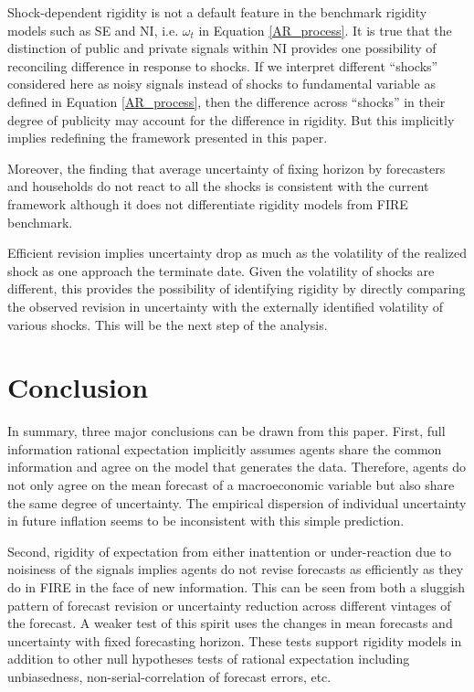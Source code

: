 \documentclass[12pt]{article}
\begin{document}
	Shock-dependent rigidity is not a default feature in the benchmark rigidity models such as SE and NI, i.e. $\omega_t$ in Equation \ref{AR_process}. It is true that the distinction of public and private signals within NI provides one possibility of reconciling difference in response to shocks.  If we interpret different ``shocks'' considered here as noisy signals instead of shocks to fundamental variable as defined in Equation \ref{AR_process}, then the difference across ``shocks'' in their degree of publicity may account for the difference in rigidity.  But this implicitly implies redefining the  framework presented in this paper. 
	
	Moreover, the finding that average uncertainty of fixing horizon by forecasters and households do not react to all the shocks is consistent with the current framework although it does not differentiate rigidity models from FIRE benchmark.  
	
	Efficient revision implies  uncertainty drop as much as the volatility of the realized shock as one approach the terminate date. Given the volatility of shocks are different, this provides the possibility of identifying rigidity by directly comparing the observed revision in uncertainty with the externally identified volatility of various shocks. This will be the next step of the analysis.  
	
	\section{Conclusion}\label{Conclusion}
	
	In summary, three major conclusions can be drawn from this paper.  First, full information rational expectation implicitly assumes agents share the common information and agree on the model that generates the data. Therefore, agents do not only agree on the mean forecast of a macroeconomic variable but also share the same degree of uncertainty. The empirical dispersion of individual uncertainty in future inflation seems to be inconsistent with this simple prediction. 
	
	Second, rigidity of expectation from either inattention or under-reaction due to noisiness of the signals implies agents do not revise forecasts as efficiently as they do in FIRE in the face of new information. This can be seen from both a sluggish pattern of forecast revision or uncertainty reduction across different vintages of the forecast. A weaker test of this spirit uses the changes in mean forecasts and uncertainty with fixed forecasting horizon. These tests support rigidity models in addition to other null hypotheses tests of rational expectation including unbiasedness,  non-serial-correlation of forecast errors, etc.
	
\end{document}
